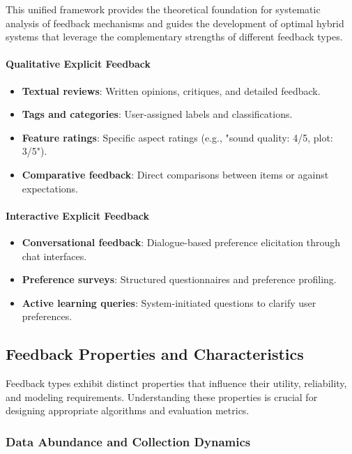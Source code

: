 This unified framework provides the theoretical foundation for systematic analysis of feedback mechanisms and guides the development of optimal hybrid systems that leverage the complementary strengths of different feedback types.

\paragraph{Qualitative Explicit Feedback}
\begin{itemize}
    \item \textbf{Textual reviews}: Written opinions, critiques, and detailed feedback.
    \item \textbf{Tags and categories}: User-assigned labels and classifications.
    \item \textbf{Feature ratings}: Specific aspect ratings (e.g., "sound quality: 4/5, plot: 3/5").
    \item \textbf{Comparative feedback}: Direct comparisons between items or against expectations.
\end{itemize}

\paragraph{Interactive Explicit Feedback}
\begin{itemize}
    \item \textbf{Conversational feedback}: Dialogue-based preference elicitation through chat interfaces.
    \item \textbf{Preference surveys}: Structured questionnaires and preference profiling.
    \item \textbf{Active learning queries}: System-initiated questions to clarify user preferences.
\end{itemize}

\subsection{Feedback Properties and Characteristics}

Feedback types exhibit distinct properties that influence their utility, reliability, and modeling requirements. Understanding these properties is crucial for designing appropriate algorithms and evaluation metrics.

\subsubsection{Data Abundance and Collection Dynamics}


